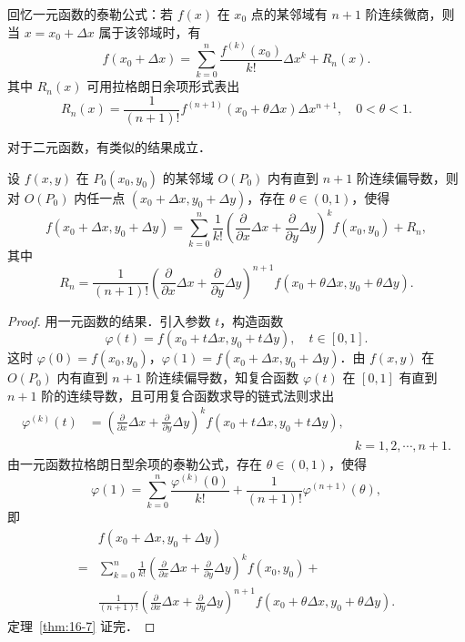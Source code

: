 回忆一元函数的泰勒公式：若 $f(x)$ 在 $x_{0}$ 点的某邻域有 $n+1$ 阶连续微商，则当 $x=x_{0}+\Delta x$ 属于该邻域时，有
\begin{equation}
f\left(x_{0}+\Delta x\right)=\sum_{k=0}^{n}\frac{f^{(k)}\left(x_{0}\right)}{k!}\Delta x^{k}+R_{n}(x).
\tag{1}
\end{equation}
其中 $R_{n}(x)$ 可用拉格朗日余项形式表出
\[
R_{n}(x)=\frac{1}{(n+1)!}f^{(n+1)}\left(x_{0}+\theta\Delta x\right)\Delta x^{n+1},\quad 0<\theta<1.
\]

对于二元函数，有类似的结果成立．

\begin{theorem}[（泰勒定理）]\label{thm:16-7}
设 $f(x,y)$ 在 $P_{0}(x_{0},y_{0})$ 的某邻域 $O(P_{0})$ 内有直到 $n+1$ 阶连续偏导数，则对 $O(P_{0})$ 内任一点 $(x_{0}+\Delta x,y_{0}+\Delta y)$，存在 $\theta\in(0,1)$，使得
\begin{equation}
f\left(x_{0}+\Delta x,y_{0}+\Delta y\right)=\sum_{k=0}^{n}\frac{1}{k!}\left(\frac{\partial}{\partial x}\Delta x+\frac{\partial}{\partial y}\Delta y\right)^{k}f\left(x_{0},y_{0}\right)+R_{n},
\tag{2}
\end{equation}
其中
\[
R_{n}=\frac{1}{(n+1)!}\left(\frac{\partial}{\partial x}\Delta x+\frac{\partial}{\partial y}\Delta y\right)^{n+1}f\left(x_{0}+\theta\Delta x,y_{0}+\theta\Delta y\right).
\]
\end{theorem}

\begin{proof}
用一元函数的结果．引入参数 $t$，构造函数
\[
\varphi(t)=f\left(x_{0}+t\Delta x,y_{0}+t\Delta y\right),\quad t\in[0,1].
\]
这时 $\varphi(0)=f(x_{0},y_{0})$，$\varphi(1)=f(x_{0}+\Delta x,y_{0}+\Delta y)$．由 $f(x,y)$ 在 $O(P_{0})$ 内有直到 $n+1$ 阶连续偏导数，知复合函数 $\varphi(t)$ 在 $[0,1]$ 有直到 $n+1$ 阶的连续导数，且可用复合函数求导的链式法则求出
\[
\begin{aligned}
\varphi^{(k)}(t)&=\left(\frac{\partial}{\partial x}\Delta x+\frac{\partial}{\partial y}\Delta y\right)^{k}f\left(x_{0}+t\Delta x,y_{0}+t\Delta y\right),\\
&&k=1,2,\cdots,n+1.
\end{aligned}
\]
由一元函数拉格朗日型余项的泰勒公式，存在 $\theta\in(0,1)$，使得
\[
\varphi(1)=\sum_{k=0}^{n}\frac{\varphi^{(k)}(0)}{k!}+\frac{1}{(n+1)!}\varphi^{(n+1)}(\theta),
\]
即
\[
\begin{aligned}
&f\left(x_{0}+\Delta x,y_{0}+\Delta y\right)\\
={}&\sum_{k=0}^{n}\frac{1}{k!}\left(\frac{\partial}{\partial x}\Delta x+\frac{\partial}{\partial y}\Delta y\right)^{k}f\left(x_{0},y_{0}\right)+{}\\
&\frac{1}{(n+1)!}\left(\frac{\partial}{\partial x}\Delta x+\frac{\partial}{\partial y}\Delta y\right)^{n+1}f\left(x_{0}+\theta\Delta x,y_{0}+\theta\Delta y\right).
\end{aligned}
\]
定理~\ref{thm:16-7} 证完．
\end{proof}

